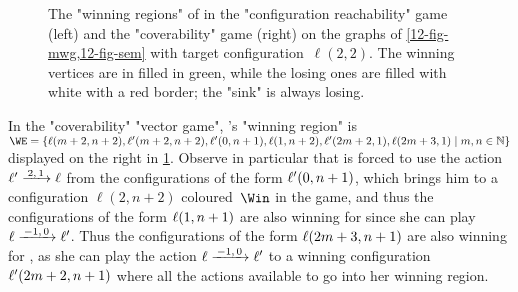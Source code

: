 \begin{example}
\begin{figure}[htbp]
{}
  \caption{\label{12-fig-cov} The "winning regions" of \Eve in the
    "configuration reachability" game (left) and the "coverability" game
    (right) on the graphs of \cref{12-fig-mwg,12-fig-sem} with target
    configuration~$\ell(2,2)$.  The winning vertices are in filled in
    green, while the losing ones are filled with white with a red
    border; the "sink" is always losing.}
\end{figure}

In the "coverability" "vector game", \Eve's "winning region" is
$\WE=\{\loc(m+2,n+2),\loc'(m+2,n+2),\loc'(0,n+1),\loc(1,n+2),\loc'(2m+2,1),\loc(2m+3,1)\mid
m,n\in\+N\}$
displayed on the right in \cref{12-fig-cov}.  Observe in particular
that \Adam is forced to use the action $\ell'\step{2,1}\ell$ from
the configurations of the form $\ell'(0,n+1)$, which brings him to a
configuration $\ell(2,n+2)$ coloured~$\Win$ in the game, and thus the
configurations of the form $\ell(1,n+1)$ are also winning for \Eve
since she can play $\loc\step{-1,0}\loc'$.  Thus the configurations of
the form $\ell(2m+3,n+1)$ are also winning for \Eve, as she can play
the action $\loc\step{-1,0}\loc'$ to a winning configuration
$\ell'(2m+2,n+1)$ where all the actions available to \Adam go into
her winning region.
\end{example}

